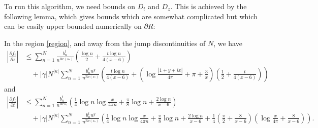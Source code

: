 To run this algorithm, we need bounds on $D_t$ and $D_z$.  This is achieved by the following lemma, which gives bounds which are somewhat complicated but which can be easily upper bounded numerically on $\partial R$:

\begin{lemma} In the region \eqref{region}, and away from the jump discontinuities of $N$, we have
\begin{align*}
 \left|\frac{\partial f_t}{\partial z}\right| &\leq  \sum_{n=1}^N \frac{b_n^t}{n^{\mathrm{Re}(s_*)}} \left(\frac{\log n}{2} + \frac{t \log n}{4(x-6)}\right) \\
&\quad + |\gamma| N^{|\kappa|} \sum_{n=1}^N \frac{b_n^t n^{y} }{n^{\mathrm{Re}(s_{*})}}
\left( \frac{t \log n}{4(x-6)} + \left(\log \frac{|1+y+ix|}{4\pi} + \pi + \frac{3}{x}\right) \left(\frac{1}{2} + \frac{t}{4(x-6)}\right)\right)
\end{align*}
and
\begin{align*} \left|\frac{\partial f_t}{\partial t}\right| &\leq \sum_{n=1}^N \frac{b_n^t}{n^{\mathrm{Re} s_*}} \left(\frac{1}{4} \log n \log \frac{x}{4\pi n} + \frac{\pi}{8} \log n + \frac{2 \log n}{x-6}\right) \\
&\quad + |\gamma| N^{|\kappa|} \sum_{n=1}^N \frac{b_n^t n^y}{n^{\mathrm{Re}(s_{*})}}
\left(\frac{1}{4} \log n \log \frac{x}{4\pi n} + \frac{\pi}{8} \log n + \frac{2 \log n}{x-6} + \frac{1}{4} \left(\frac{\pi}{2} + \frac{8}{x-6}\right) \left(\log \frac{x}{4\pi} + \frac{8}{x-6}\right)\right).
\end{align*}
\end{lemma}


